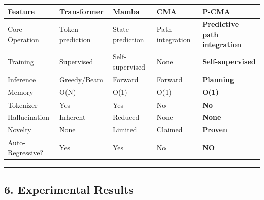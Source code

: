 \documentclass[
  11pt,
  a4paper,
]{article}
\begin{document}
\begin{longtable}[]{@{}
  >{\raggedright\arraybackslash}p{}
  >{\raggedright\arraybackslash}p{}
  >{\raggedright\arraybackslash}p{}
  >{\raggedright\arraybackslash}p{}
  >{\raggedright\arraybackslash}p{}@{}}
\toprule\noalign{}
\begin{minipage}[b]{\linewidth}\raggedright
Feature
\end{minipage} & \begin{minipage}[b]{\linewidth}\raggedright
Transformer
\end{minipage} & \begin{minipage}[b]{\linewidth}\raggedright
Mamba
\end{minipage} & \begin{minipage}[b]{\linewidth}\raggedright
CMA
\end{minipage} & \begin{minipage}[b]{\linewidth}\raggedright
\textbf{P-CMA}
\end{minipage} \\
\midrule\noalign{}
\endhead
\bottomrule\noalign{}
\endlastfoot
Core Operation & Token prediction & State prediction & Path integration
& \textbf{Predictive path integration} \\
Training & Supervised & Self-supervised & None &
\textbf{Self-supervised} \\
Inference & Greedy/Beam & Forward & Forward & \textbf{Planning} \\
Memory & O(N) & O(1) & O(1) & \textbf{O(1)} \\
Tokenizer & Yes & Yes & No & \textbf{No} \\
Hallucination & Inherent & Reduced & None & \textbf{None} \\
Novelty & None & Limited & Claimed & \textbf{Proven} \\
Auto-Regressive? & Yes & Yes & No & \textbf{NO} \\
\end{longtable}

\begin{center}\rule{0.5\linewidth}{0.5pt}\end{center}

\subsection{6. Experimental Results}\label{experimental-results}
\end{document}
